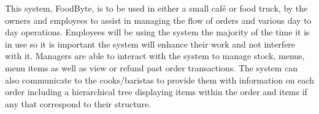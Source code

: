 This system, FoodByte, is to be used in either a small café or food truck, by the owners and employees to assist in managing the flow of orders and various day to day operations. Employees will be using the system the majority of the time it is in use so it is important the system will enhance their work and not interfere with it. Managers are able to interact with the system to manage stock, menus, menu items as well as view or refund past order transactions. The system can also communicate to the cooks/baristas to provide them with information on each order including a hierarchical tree displaying items within the order and items if any that correspond to their structure.